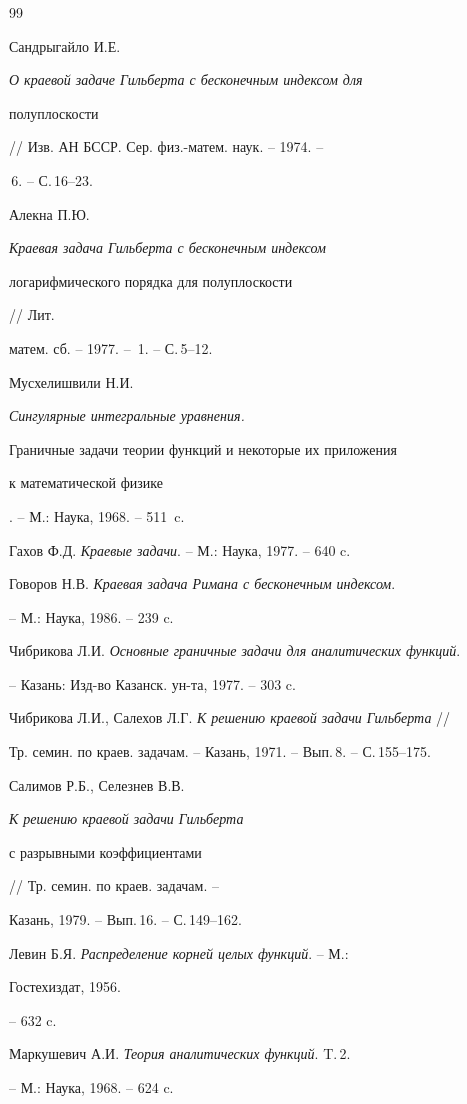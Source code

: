 \begin{thebibliography}{99}







Сандрыгайло И.Е. {\em О краевой задаче Гильберта с бесконечным индексом для


полуплоскости} // Изв. АН БССР. Сер. физ.-матем. наук. -- 1974. --


\No\,6. -- С.\,16--23.




Алекна П.Ю. {\em Краевая задача Гильберта с бесконечным индексом


логарифмического  порядка для полуплоскости} // Лит.


матем. сб. -- 1977. -- \No\,1. -- С.\,5--12.




Мусхелишвили Н.И. {\em Сингулярные интегральные уравнения.


Граничные задачи теории функций и некоторые их приложения


к математической физике}. -- М.: Наука, 1968. -- 511~c.




Гахов Ф.Д. {\em Краевые задачи}. -- М.: Наука, 1977. -- 640 c.




Говоров Н.В. {\em Краевая задача Римана с бесконечным индексом}.


-- М.: Наука, 1986. -- 239 c.




Чибрикова Л.И. {\em Основные граничные задачи для аналитических функций}.


-- Казань: Изд-во Казанск. ун-та, 1977. -- 303 c.




Чибрикова Л.И., Салехов Л.Г. {\em К решению краевой задачи Гильберта} //


Тр. семин. по краев. задачам. -- Казань, 1971. -- Вып.\,8. -- С.\,155--175.




Салимов Р.Б., Селезнев В.В. {\em К решению краевой задачи Гильберта


с разрывными коэффициентами} // Тр. семин. по краев. задачам. --


Казань, 1979. -- Вып.\,16. -- С.\,149--162.




Левин Б.Я. {\em Распределение корней целых функций}. -- М.:


Гостехиздат, 1956.


-- 632 c.




Маркушевич А.И. {\em Теория аналитических функций}. T.\,2.


-- М.: Наука, 1968. -- 624 c.





\end{thebibliography}





